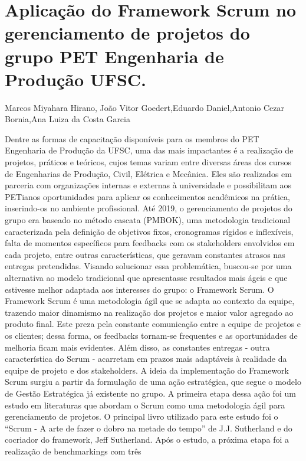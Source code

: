 

\section{Aplicação do Framework Scrum no gerenciamento de projetos do grupo PET Engenharia de Produção UFSC.}

Marcos Miyahara Hirano, João Vitor Goedert,Eduardo Daniel,Antonio Cezar Bornia,Ana Luiza da Costa Garcia

Dentre as formas de capacitação disponíveis para os membros do PET Engenharia de 
Produção da UFSC, uma das mais impactantes é a realização de projetos, práticos e teóricos, cujos 
temas variam entre diversas áreas dos cursos de Engenharias de Produção, Civil, Elétrica e 
Mecânica. Eles são realizados em parceria com organizações internas e externas à universidade e 
possibilitam aos PETianos oportunidades para aplicar os conhecimentos acadêmicos na prática, 
inserindo-os no ambiente profissional.
Até 2019, o gerenciamento de projetos do grupo era baseado no método cascata (PMBOK), 
uma metodologia tradicional caracterizada pela definição de objetivos fixos, cronogramas rígidos 
e inflexíveis, falta de momentos específicos para feedbacks com os stakeholders envolvidos em 
cada projeto, entre outras características, que geravam constantes atrasos nas entregas pretendidas. 
Visando solucionar essa problemática, buscou-se por uma alternativa ao modelo tradicional que 
apresentasse resultados mais ágeis e que estivesse melhor adaptada aos interesses do grupo: o
Framework Scrum.
O Framework Scrum é uma metodologia ágil que se adapta ao contexto da equipe, trazendo 
maior dinamismo na realização dos projetos e maior valor agregado ao produto final. Este preza 
pela constante comunicação entre a equipe de projetos e os clientes; dessa forma, os feedbacks 
tornam-se frequentes e as oportunidades de melhoria ficam mais evidentes. Além disso, as 
constantes entregas - outra característica do Scrum - acarretam em prazos mais adaptáveis à 
realidade da equipe de projeto e dos stakeholders.
A ideia da implementação do Framework Scrum surgiu a partir da formulação de 
uma ação estratégica, que segue o modelo de Gestão Estratégica já existente no grupo. A primeira 
etapa dessa ação foi um estudo em literaturas que abordam o Scrum como uma metodologia ágil 
para gerenciamento de projetos. O principal livro utilizado para este estudo foi o “Scrum - A arte 
de fazer o dobro na metade do tempo” de J.J. Sutherland e do cocriador do framework, Jeff 
Sutherland. Após o estudo, a próxima etapa foi a realização de benchmarkings com três 
